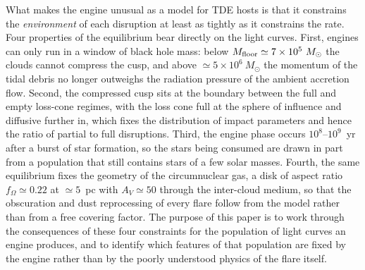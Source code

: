 \documentclass[twocolumn,pdftex]{aastex701}
\newcommand{\msun}{M_{\odot}\xspace}
\newcommand{\fom}{f_{\Omega}\xspace}
\newcommand{\Av}{A_{V}\xspace}
\begin{document}
What makes the engine unusual as a model for TDE hosts is that it constrains the {\it environment} of each disruption at least as tightly as it constrains the rate. Four properties of the equilibrium bear directly on the light curves. First, engines can only run in a window of black hole mass: below $M_{\rm floor} \simeq 7 \times 10^{5}~\msun$ the clouds cannot compress the cusp, and above $\simeq 5 \times 10^{6}~\msun$ the momentum of the tidal debris no longer outweighs the radiation pressure of the ambient accretion flow. Second, the compressed cusp sits at the boundary between the full and empty loss-cone regimes, with the loss cone full at the sphere of influence and diffusive further in, which fixes the distribution of impact parameters and hence the ratio of partial to full disruptions. Third, the engine phase occurs $10^{8}$--$10^{9}$~yr after a burst of star formation, so the stars being consumed are drawn in part from a population that still contains stars of a few solar masses. Fourth, the same equilibrium fixes the geometry of the circumnuclear gas, a disk of aspect ratio $\fom \simeq 0.22$ at $\simeq 5$~pc with $\Av \simeq 50$ through the inter-cloud medium, so that the obscuration and dust reprocessing of every flare follow from the model rather than from a free covering factor. The purpose of this paper is to work through the consequences of these four constraints for the population of light curves an engine produces, and to identify which features of that population are fixed by the engine rather than by the poorly understood physics of the flare itself.
\end{document}
